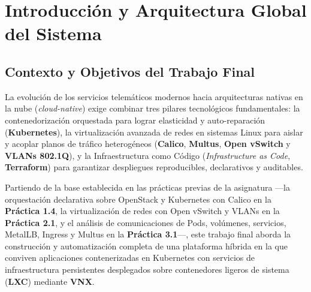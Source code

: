 \chapter{Introducción y Arquitectura Global del Sistema}

\section{Contexto y Objetivos del Trabajo Final}

La evolución de los servicios telemáticos modernos hacia arquitecturas nativas en la nube (\textit{cloud-native}) exige combinar tres pilares tecnológicos fundamentales: la contenedorización orquestada para lograr elasticidad y auto-reparación (\textbf{Kubernetes}), la virtualización avanzada de redes en sistemas Linux para aislar y acoplar planos de tráfico heterogéneos (\textbf{Calico}, \textbf{Multus}, \textbf{Open vSwitch} y \textbf{VLANs 802.1Q}), y la Infraestructura como Código (\textit{Infrastructure as Code}, \textbf{Terraform}) para garantizar despliegues reproducibles, declarativos y auditables.

Partiendo de la base establecida en las prácticas previas de la asignatura ---la orquestación declarativa sobre OpenStack y Kubernetes con Calico en la \textbf{Práctica 1.4}, la virtualización de redes con Open vSwitch y VLANs en la \textbf{Práctica 2.1}, y el análisis de comunicaciones de Pods, volúmenes, servicios, MetalLB, Ingress y Multus en la \textbf{Práctica 3.1}---, este trabajo final aborda la construcción y automatización completa de una plataforma híbrida en la que conviven aplicaciones contenerizadas en Kubernetes con servicios de infraestructura persistentes desplegados sobre contenedores ligeros de sistema (\textbf{LXC}) mediante \textbf{VNX}.

